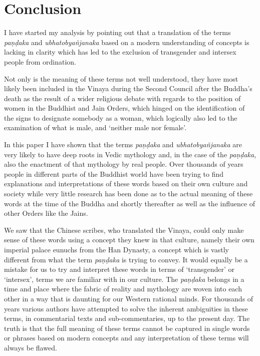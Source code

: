 \section{Conclusion}
I have started my analysis by pointing out that a translation of the terms {\em paṇḍaka} and {\em ubhatob­yañ­janaka} based on a modern understanding of concepts is lacking in clarity which has led to the exclusion of transgender and intersex people from ordination.

Not only is the meaning of these terms not well understood, they have most likely been included in the Vinaya during the Second Council after the Buddha's death as the result of a wider religious debate with regards to the position of women in the Buddhist and Jain Orders, which hinged on the identification of the signs to designate somebody as a woman, which logically also led to the examination of what is male, and `neither male nor female'.

In this paper I have shown that the terms {\em paṇḍaka} and {\em ubhatob­yañ­janaka} are very likely to have deep roots in Vedic mythology and, in the case of the {\em paṇḍaka}, also the enactment of that mythology by real people. Over thousands of years people in different parts of the Buddhist world have been trying to find explanations and interpretations of these words based on their own culture and society while very little research has been done as to the actual meaning of these words at the time of the Buddha and shortly thereafter as well as the influence of other Orders like the Jains. 

We saw that the Chinese scribes, who translated the Vinaya, could only make sense of these words using a concept they knew in that culture, namely their own imperial palace eunuchs from the Han Dynasty, a concept which is vastly different from what the term {\em paṇḍaka} is trying to convey. It would equally be a mistake for us to try and interpret these words in terms of `transgender' or `intersex', terms we are familiar with in our culture. The {\em paṇḍaka} belongs in a time and place where the fabric of reality and mythology are woven into each other in a way that is daunting for our Western rational minds. For thousands of years various authors have attempted to solve the inherent ambiguities in these terms, in commentarial texts and sub-commentaries, up to the present day. The truth is that the full meaning of these terms cannot be captured in single words or phrases based on modern concepts and any interpretation of these terms will always be flawed.

